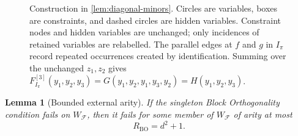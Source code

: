 \documentclass[11pt]{article}
\theoremstyle{plain}
\newtheorem{lemma}[lemma]{Lemma}
\theoremstyle{definition}
\theoremstyle{remark}
\newcommand{\cF}{\mathcal F}
\begin{document}
\begin{figure}[!htbp]
{%
  }
  \caption{Construction in \cref{lem:diagonal-minors}.  Circles are
  variables, boxes are constraints, and dashed circles are hidden variables.
  Constraint nodes and hidden variables are unchanged; only incidences of
  retained variables are relabelled.  The parallel edges at $f$ and $g$ in
  $I_\pi$ record repeated occurrences created by identification.  Summing
  over the unchanged $z_1,z_2$ gives
  $F_{I_\pi}^{[3]}(y_1,y_2,y_3)
   =G(y_1,y_2,y_1,y_3,y_2)=H(y_1,y_2,y_3)$.}
  \label{fig:diagonal-minor-example}
\end{figure}

\begin{lemma}[Bounded external arity]
\label{lem:bo-arity-bound}
If the singleton Block Orthogonality condition fails on $W_{\cF}$, then it
fails for some member of $W_{\cF}$ of arity at most
\[
  R_{\mathrm{BO}}=d^2+1.
\]
\end{lemma}
\end{document}
